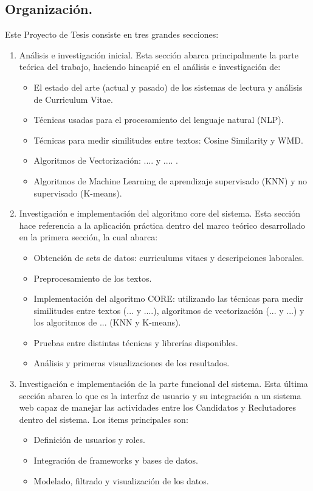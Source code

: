 \documentclass[12pt,a4paper]{article}
\begin{document}
\subsection{Organización.}
Este Proyecto de Tesis consiste en tres grandes secciones:
\begin{enumerate}

\item Análisis e investigación inicial. Esta sección abarca principalmente la parte teórica del trabajo, haciendo hincapié en el análisis e investigación de:
\begin{itemize}
	\item El estado del arte (actual y pasado) de los sistemas de lectura y análisis de Curriculum Vitae.
	\item Técnicas usadas para el procesamiento del lenguaje natural (NLP).
	\item Técnicas para medir similitudes entre textos: Cosine Similarity y WMD.
	\item Algoritmos de Vectorización: .... y .... .
	\item Algoritmos de Machine Learning de aprendizaje supervisado (KNN) y no supervisado (K-means).
\end{itemize} 

\item Investigación e implementación del algoritmo core del sistema. Esta sección hace referencia a la aplicación práctica dentro del marco teórico desarrollado en la primera sección, la cual abarca:
\begin{itemize}
	\item Obtención de sets de datos: curriculums vitaes y descripciones laborales. 
	\item Preprocesamiento de los textos.
	\item Implementación del algoritmo CORE: utilizando las técnicas para medir similitudes entre textos (... y ....), algoritmos de vectorización (... y ...) y los algoritmos de ... (KNN y K-means).
	\item Pruebas entre distintas técnicas y librerías disponibles. 
	\item Análisis y primeras visualizaciones de los resultados.
\end{itemize} 
	
\item Investigación e implementación de la parte funcional del sistema. Esta última sección abarca lo que es la interfaz de usuario y su integración a un sistema web capaz de manejar las actividades entre los Candidatos y Reclutadores dentro del sistema. Los items principales son:
\begin{itemize}
	\item Definición de usuarios y roles.
	\item Integración de frameworks y bases de datos.  
	\item Modelado, filtrado y visualización de los datos.
\end{itemize} 

\end{enumerate}
\end{document}
